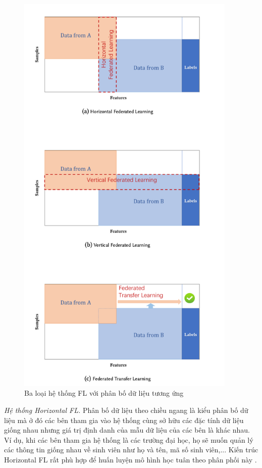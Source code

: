 \begin{figure}[H]
    \begin{center}
        \includegraphics[height=20cm]{images/taxonomy_fl.png}
        \caption{Ba loại hệ thống FL với phân bố dữ liệu tương ứng \cite{yang2019federated}}
        \label{fig:taxonomy_fl}
    \end{center}
\end{figure}

\textit{Hệ thống Horizontal FL.} Phân bố dữ liệu theo chiều ngang là kiểu phân bố dữ liệu mà ở đó các bên tham gia vào hệ thống cùng sở hữu các đặc tính dữ liệu giống nhau nhưng giá trị định danh của mẫu dữ liệu của các bên là khác nhau. Ví dụ, khi các bên tham gia hệ thống là các trường đại học, họ sẽ muốn quản lý các thông tin giống nhau về sinh viên như họ và tên, mã số sinh viên,... Kiến trúc Horizontal FL rất phù hợp để huấn luyện mô hình học tuân theo phân phối này \cite{yin2021comprehensive}.

